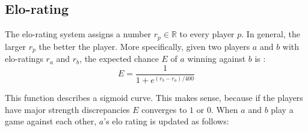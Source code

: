 \documentclass[12pt]{article}
\begin{document}
\subsection{Elo-rating} \label{sec:Evaluation:elo-rating}
The elo-rating system assigns a number \(r_p \in \mathbb{R}\) to every player \(p\). In general, the larger \(r_p\) the better the player. More specifically, given two players \(a\) and \(b\) with elo-ratings \(r_a\) and \(r_b\), the expected chance \(E\) of \(a\) winning against \(b\) is \cite{silver2018general}:
\begin{equation} \label{eq:elo_pred}
E = \frac{1}{1 + e^{(r_b-r_a)/400}}
\end{equation}
\begin{center}

\end{center}
This function describes a sigmoid curve. This makes sense, because if the players have major strength discrepancies \(E\) converges to \(1\) or \(0\). 
\newpage\noindent
When \(a\) and \(b\) play a game against each other, \(a\)'s elo rating is updated as follows\cite{elo1978rating}:
\end{document}
